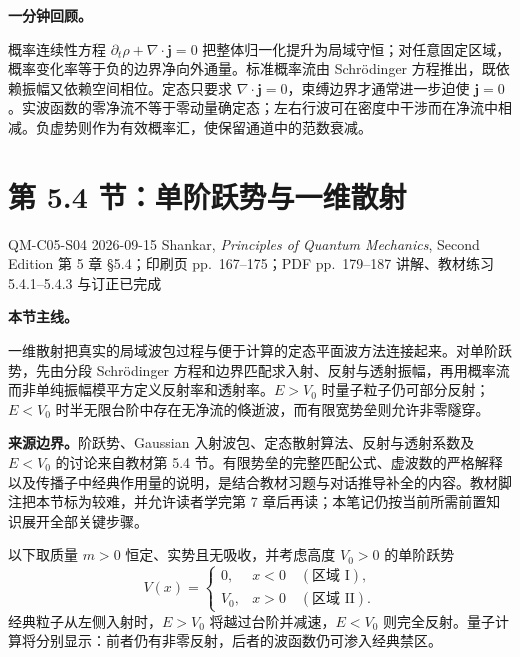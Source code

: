 \textbf{一分钟回顾。}

概率连续性方程 $\partial_t\rho+\nabla\cdot\mathbf j=0$ 把整体归一化提升为局域守恒；对任意固定区域，概率变化率等于负的边界净向外通量。标准概率流由 Schr\"odinger 方程推出，既依赖振幅又依赖空间相位。定态只要求 $\nabla\cdot\mathbf j=0$，束缚边界才通常进一步迫使 $\mathbf j=0$。实波函数的零净流不等于零动量确定态；左右行波可在密度中干涉而在净流中相减。负虚势则作为有效概率汇，使保留通道中的范数衰减。

\section{第 5.4 节：单阶跃势与一维散射}
\label{section:QM-C05-S04}

\studymeta
  {QM-C05-S04}
  {2026-09-15}
  {Shankar, \textit{Principles of Quantum Mechanics}, Second Edition}
  {第 5 章 \S 5.4；印刷页 pp.~167--175；PDF pp.~179--187}
  {讲解、教材练习 5.4.1--5.4.3 与订正已完成}

\textbf{本节主线。}

一维散射把真实的局域波包过程与便于计算的定态平面波方法连接起来。对单阶跃势，先由分段 Schr\"odinger 方程和边界匹配求入射、反射与透射振幅，再用概率流而非单纯振幅模平方定义反射率和透射率。$E>V_0$ 时量子粒子仍可部分反射；$E<V_0$ 时半无限台阶中存在无净流的倏逝波，而有限宽势垒则允许非零隧穿。

\textbf{来源边界。}阶跃势、Gaussian 入射波包、定态散射算法、反射与透射系数及 $E<V_0$ 的讨论来自教材第 5.4 节。有限势垒的完整匹配公式、虚波数的严格解释以及传播子中经典作用量的说明，是结合教材习题与对话推导补全的内容。教材脚注把本节标为较难，并允许读者学完第 7 章后再读；本笔记仍按当前所需前置知识展开全部关键步骤。



以下取质量 $m>0$ 恒定、实势且无吸收，并考虑高度 $V_0>0$ 的单阶跃势
\begin{equation}
  V(x)=
  \begin{cases}
    0,&x<0\quad(\text{区域 I}),\\
    V_0,&x>0\quad(\text{区域 II}).
  \end{cases}
  \label{eq:QM-C05-S04-step-potential}
\end{equation}
经典粒子从左侧入射时，$E>V_0$ 将越过台阶并减速，$E<V_0$ 则完全反射。量子计算将分别显示：前者仍有非零反射，后者的波函数仍可渗入经典禁区。

